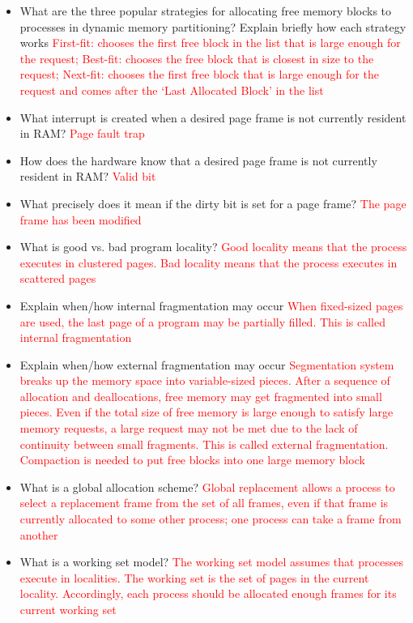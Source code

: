 \documentclass[9pt,landscape]{memoir}
\newcommand{\answer}[1]{\textcolor{red}{#1}}
\begin{document}
\begin{multicols}{6}
\begin{itemize}
    \item What are the three popular strategies for allocating free memory blocks to processes in dynamic memory partitioning? Explain briefly how each strategy works \answer{First-fit: chooses the first free block in the list that is large enough for the request; Best-fit: chooses the free block that is closest in size to the request; Next-fit: chooses the first free block that is large enough for the request and comes after the `Last Allocated Block' in the list}
    \item What interrupt is created when a desired page frame is not currently resident in RAM?  \answer{Page fault trap}
    \item How does the hardware know that a desired page frame is not currently resident in RAM?  \answer{Valid bit}
    \item What precisely does it mean if the dirty bit is set for a page frame?  \answer{The page frame has been modified}
    \item What is good vs. bad program locality?  \answer{Good locality means that the process executes in clustered pages. Bad locality means that the process executes in scattered pages}
    \item Explain when/how internal fragmentation may occur \answer{When fixed-sized pages are used, the last page of a program may be partially filled. This is called internal fragmentation}
    \item Explain when/how external fragmentation may occur \answer{Segmentation system breaks up the memory space into variable-sized pieces. After a sequence of allocation and deallocations, free memory may get fragmented into small pieces. Even if the total size of free memory is large enough to satisfy large memory requests, a large request may not be met due to the lack of continuity between small fragments. This is called external fragmentation. Compaction is needed to put free blocks into one large memory block}
    \item What is a global allocation scheme?  \answer{Global replacement allows a process to select a replacement frame from the set of all frames, even if that frame is currently allocated to some other process; one process can take a frame from another}
    \item What is a working set model?  \answer{The working set model assumes that processes execute in localities. The working set is the set of pages in the current locality. Accordingly, each process should be allocated enough frames for its current working set}

\end{itemize}
\end{multicols}
\end{document}
